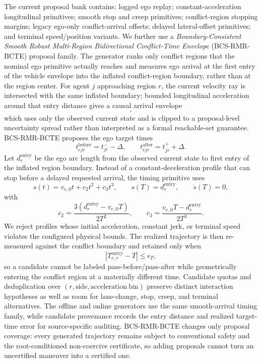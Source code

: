 \documentclass[10pt]{article}
\begin{document}
The current proposal bank contains: logged ego replay; constant-acceleration longitudinal primitives; smooth stop and creep primitives; conflict-region stopping margins; legacy ego-only conflict-arrival offsets; delayed lateral-offset primitives; and terminal speed/position variants.  We further use a \emph{Boundary-Consistent Smooth Robust Multi-Region Bidirectional Conflict-Time Envelope} (BCS-RMR-BCTE) proposal family.  The generator ranks only conflict regions that the nominal ego primitive actually reaches and measures ego arrival at the first entry of the vehicle envelope into the inflated conflict-region boundary, rather than at the region center.  For agent $j$ approaching region $r$, the current velocity ray is intersected with the same inflated boundary; bounded longitudinal acceleration around that entry distance gives a causal arrival envelope
\begin{equation}
    [t^-_{jr},t^+_{jr}],
\end{equation}
which uses only the observed current state and is clipped to a proposal-level uncertainty spread rather than interpreted as a formal reachable-set guarantee.  BCS-RMR-BCTE proposes the ego target times
\begin{equation}
    t^{\mathrm{before}}_{ejr}=t^-_{jr}-\Delta,
    \qquad
    t^{\mathrm{after}}_{ejr}=t^+_{jr}+\Delta.
\end{equation}
Let $d^{\mathrm{entry}}_r$ be the ego arc length from the observed current state to first entry of the inflated region boundary.  Instead of a constant-deceleration profile that can stop before a delayed requested arrival, the timing primitive uses
\begin{equation}
    s(t)=v_{e,0}t+c_2t^2+c_3t^3,
    \qquad
    s(T)=d^{\mathrm{entry}}_r,
    \qquad
    \ddot s(T)=0,
\end{equation}
with
\begin{equation}
    c_2=\frac{3(d^{\mathrm{entry}}_r-v_{e,0}T)}{2T^2},
    \qquad
    c_3=\frac{v_{e,0}T-d^{\mathrm{entry}}_r}{2T^3}.
\end{equation}
We reject profiles whose initial acceleration, constant jerk, or terminal speed violates the configured physical bounds.  The realized trajectory is then re-measured against the conflict boundary and retained only when
\begin{equation}
    |T^{\mathrm{entry}}_{e,r}-T|\le \epsilon_T,
\end{equation}
so a candidate cannot be labeled pass-before/pass-after while geometrically entering the conflict region at a materially different time.  Candidate quotas and deduplication over $(r,\mathrm{side},\mathrm{acceleration\ bin})$ preserve distinct interaction hypotheses as well as room for lane-change, stop, creep, and terminal alternatives.  The offline and online generators use the same smooth-arrival timing family, while candidate provenance records the entry distance and realized target-time error for source-specific auditing.  BCS-RMR-BCTE changes only proposal coverage: every generated trajectory remains subject to conventional safety and the root-conditioned non-coercive certificate, so adding proposals cannot turn an uncertified maneuver into a certified one.
\end{document}
